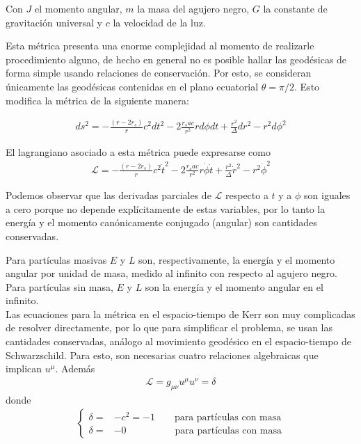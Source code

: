 \documentclass{article}
\begin{document}
Con $J$ el momento angular, $m$ la masa del agujero negro, $G$ la constante de gravitación universal y $c$ la velocidad de la luz. 

\medskip

Esta métrica presenta una enorme complejidad al momento de realizarle procedimiento alguno, de hecho en general no es posible hallar las geodésicas de forma simple usando relaciones de conservación. Por esto, se consideran únicamente las geodésicas contenidas en el plano ecuatorial $\theta=\pi/2$. Esto modifica la métrica de la siguiente manera:

\begin{align*}
    ds^2=-\frac{(r-2r_s)}{r}c^2dt^2-2\frac{r_sac}{r^2}r d\phi dt +\frac{r^2}{\Delta}dr^2-r^2d\phi^2
\end{align*}

El lagrangiano asociado a esta métrica puede expresarse como 
\begin{align*}
    \mathcal{L}=-\frac{(r-2r_s)}{r}c^2\dot{t}^2-2\frac{r_sac}{r^2}r \dot{\phi} \dot{t} +\frac{r^2}{\Delta}\dot{r}^2-r^2\dot{\phi}^2
\end{align*}

Podemos observar que las derivadas parciales de $\mathcal{L}$ respecto a $t$ y a $\phi$ son iguales a cero porque no depende explícitamente de estas variables, por lo tanto la energía y el momento canónicamente conjugado (angular) son cantidades conservadas.

Para partículas masivas $E$ y $L$ son, respectivamente, la energía y
el momento angular por unidad de masa, medido al infinito con respecto al agujero negro. Para partículas sin masa, $E$ y $L$ son la energía y el momento angular en el infinito.\\
Las ecuaciones para la métrica en el espacio-tiempo de Kerr son muy complicadas de resolver directamente, por lo que para simplificar el problema, se usan las cantidades conservadas, análogo al movimiento geodésico en el espacio-tiempo de Schwarzschild. Para esto, son necesarias cuatro relaciones algebraicas que implican $u^\mu$.
Además 
\begin{align}\label{20.10}
\mathcal{L}=g_{\mu\nu}u^\mu u^\nu=\delta    
\end{align}
donde
\begin{align*}
\begin{cases}
\delta=&-c^2=-1\qquad \text{para partículas con masa}\\
\delta=&-0\qquad\qquad\quad \text{para partículas con masa}
\end{cases}
\end{align*}
\end{document}
